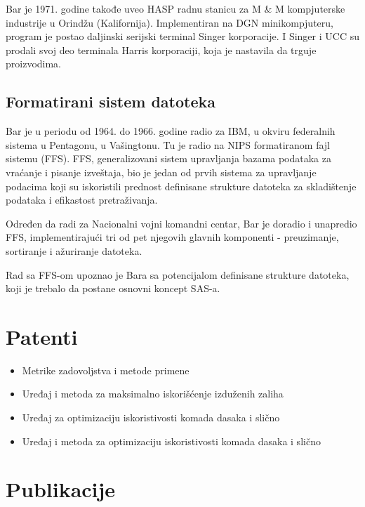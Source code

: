 \documentclass[a4paper]{article}
\begin{document}
{		Bar je 1971. godine takođe uveo HASP radnu stanicu za M \&  M kompjuterske industrije u Orindžu (Kalifornija). Implementiran na DGN minikompjuteru, program je postao daljinski serijski terminal Singer korporacije. I Singer i UCC su prodali svoj deo terminala Harris korporaciji, koja je nastavila da trguje proizvodima.
		
		\subsection{Formatirani sistem datoteka}
		Bar je u periodu od 1964. do 1966. godine radio za IBM, u okviru federalnih sistema u Pentagonu, u Vašingtonu. Tu je radio na NIPS formatiranom fajl sistemu (FFS). FFS, generalizovani sistem upravljanja bazama podataka za vraćanje i pisanje izveštaja, bio je jedan od prvih sistema za upravljanje podacima koji su iskoristili prednost definisane strukture datoteka za skladištenje podataka i efikastost pretraživanja.
		
		Određen da radi za Nacionalni vojni komandni centar, Bar je doradio i unapredio FFS, implementirajući tri od pet njegovih glavnih komponenti - preuzimanje, sortiranje i ažuriranje datoteka.
		
		Rad sa FFS-om upoznao je Bara sa potencijalom definisane strukture datoteka, koji je trebalo da postane osnovni koncept SAS-a.
		
		\newpage	
		
		\section{Patenti}
		
		\begin{itemize}
			\item Metrike zadovoljstva i metode primene
			\item Uređaj i metoda za maksimalno iskorišćenje izduženih zaliha
			\item Uređaj za optimizaciju iskoristivosti komada dasaka i slično
			\item Uređaj i metoda za optimizaciju iskoristivosti komada dasaka i slično
		\end{itemize}
		
		\section{Publikacije}
		
}
\end{document}
